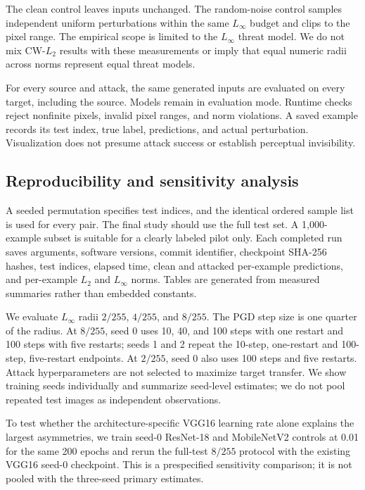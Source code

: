 \documentclass[10pt,twocolumn]{article}
\begin{document}
The clean control leaves inputs unchanged. The random-noise control samples independent uniform perturbations within the same $L_\infty$ budget and clips to the pixel range. The empirical scope is limited to the $L_\infty$ threat model. We do not mix CW-$L_2$ results with these measurements or imply that equal numeric radii across norms represent equal threat models.

For every source and attack, the same generated inputs are evaluated on every target, including the source. Models remain in evaluation mode. Runtime checks reject nonfinite pixels, invalid pixel ranges, and norm violations. A saved example records its test index, true label, predictions, and actual perturbation. Visualization does not presume attack success or establish perceptual invisibility.

\subsection{Reproducibility and sensitivity analysis}
A seeded permutation specifies test indices, and the identical ordered sample list is used for every pair. The final study should use the full test set. A 1,000-example subset is suitable for a clearly labeled pilot only. Each completed run saves arguments, software versions, commit identifier, checkpoint SHA-256 hashes, test indices, elapsed time, clean and attacked per-example predictions, and per-example $L_2$ and $L_\infty$ norms. Tables are generated from measured summaries rather than embedded constants.

We evaluate $L_\infty$ radii $2/255$, $4/255$, and $8/255$. The PGD step size is one quarter of the radius. At $8/255$, seed 0 uses 10, 40, and 100 steps with one restart and 100 steps with five restarts; seeds 1 and 2 repeat the 10-step, one-restart and 100-step, five-restart endpoints. At $2/255$, seed 0 also uses 100 steps and five restarts. Attack hyperparameters are not selected to maximize target transfer. We show training seeds individually and summarize seed-level estimates; we do not pool repeated test images as independent observations.

To test whether the architecture-specific VGG16 learning rate alone explains the largest asymmetries, we train seed-0 ResNet-18 and MobileNetV2 controls at 0.01 for the same 200 epochs and rerun the full-test $8/255$ protocol with the existing VGG16 seed-0 checkpoint. This is a prespecified sensitivity comparison; it is not pooled with the three-seed primary estimates.
\end{document}
